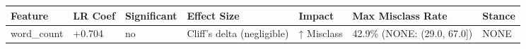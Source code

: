 \begin{tabular}{lllllll}
\toprule
Feature & LR Coef & Significant & Effect Size & Impact & Max Misclass Rate & Stance \\
\midrule
word\_count & +0.704 & no & Cliff's delta (negligible) & ↑ Misclass & 42.9\% (NONE: (29.0, 67.0]) & NONE \\
\bottomrule
\end{tabular}
